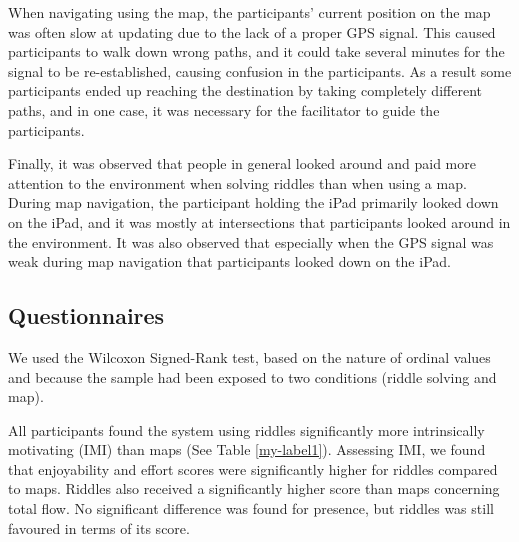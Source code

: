 When navigating using the map, the participants' current position on the map was often slow at updating due to the lack of a proper GPS signal. This caused participants to walk down wrong paths, and it could take several minutes for the signal to be re-established, causing confusion in the participants. As a result some participants ended up reaching the destination by taking completely different paths, and in one case, it was necessary for the facilitator to guide the participants.

Finally, it was observed that people in general looked around and paid more attention to the environment when solving riddles than when using a map. During map navigation, the participant holding the iPad primarily looked down on the iPad, and it was mostly at intersections that participants looked around in the environment. It was also observed that especially when the GPS signal was weak during map navigation that participants looked down on the iPad. 	
\subsection{Questionnaires}
We used the Wilcoxon Signed-Rank test, based on the nature of ordinal values and because the sample had been exposed to two conditions (riddle solving and map).

All participants found the system using riddles significantly more intrinsically motivating (IMI) than maps (See Table \ref{my-label1}). Assessing IMI, we found that enjoyability and effort scores were significantly higher for riddles compared to maps. Riddles also received a significantly higher score than maps concerning total flow. No significant difference was found for presence, but riddles was still favoured in terms of its score. 

